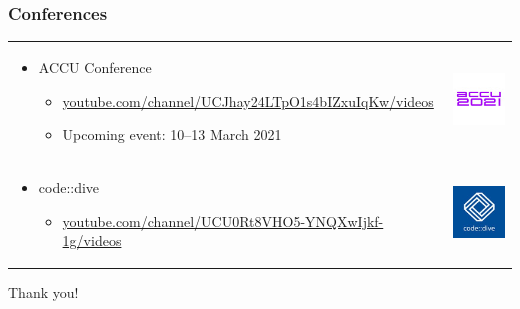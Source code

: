 \documentclass{beamer}
\begin{document}
\begin{frame}
\frametitle{Conferences}
{\centering
\begin{tabular}{m{8.5cm} m{2cm}}
\begin{itemize}
  \item ACCU Conference
  \begin{itemize}
    \item
      \href{https://www.youtube.com/channel/UCJhay24LTpO1s4bIZxuIqKw/videos}
           {youtube.com/channel/\linebreak{}UCJhay24LTpO1s4bIZxuIqKw/videos}
    \item Upcoming event: 10--13 March 2021
  \end{itemize}
\end{itemize} &
\includegraphics[width=2cm]{pics/conf_accu.jpg} \\

\begin{itemize}
  \item code::dive
  \begin{itemize}
    \item
      \href{https://www.youtube.com/channel/UCU0Rt8VHO5-YNQXwIjkf-1g/videos}
           {youtube.com/channel/\linebreak{}UCU0Rt8VHO5-YNQXwIjkf-1g/videos}
  \end{itemize}
\end{itemize} &
\includegraphics[width=2cm]{pics/conf_codedive.jpg} \\
\end{tabular}
}

\begin{center}
\Huge Thank you!
\end{center}
\end{frame}
\end{document}
